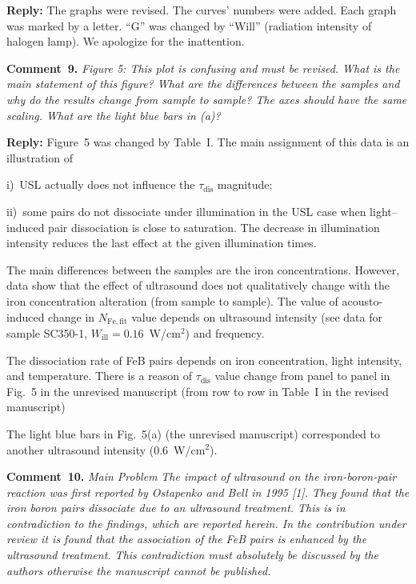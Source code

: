 \documentclass[aip,jap,preprint]{revtex4-1}
\begin{document}
\noindent
\textcolor[rgb]{0.51,0.00,0.00}{\textbf{Reply:}}
The graphs were revised.
The curves' numbers were added.
Each graph was marked by a letter.
``G'' was changed by ``Will'' (radiation intensity of halogen lamp).
We apologize for the inattention.


\vspace{1cm}
\noindent
\textcolor[rgb]{0.00,0.50,1.00}{\textbf{Comment~9.}}
\emph{Figure 5: This plot is confusing and must be revised. What is the main statement of this figure? What are the differences between the samples and why do the results change from sample to sample? The axes should have the same scaling. What are the light blue bars in (a)? }

\noindent
\textcolor[rgb]{0.51,0.00,0.00}{\textbf{Reply:}}
Figure~5 was changed by Table~I.
The main assignment of this data is an illustration of

\noindent
i)~USL actually does not influence the $\tau_\mathrm{dis}$  magnitude;

\noindent
ii)~some pairs do not dissociate under illumination in the USL case when light--induced pair dissociation is close to saturation.
The decrease in illumination intensity reduces the last effect at the given illumination times.

The main differences between the samples are the iron concentrations.
However, data show that
the effect of ultrasound does not qualitatively change with the iron concentration alteration
(from sample to sample).
The value of acousto-induced change in $N_\mathrm{Fe,fit}$ value depends on ultrasound intensity
(see data for sample SC350-1, $W_\mathrm{ill}=0.16$~W/cm$^2$) and frequency.


The dissociation rate of FeB pairs depends on iron concentration, light intensity, and
temperature\cite{Schmidt2019,FeBLight2,FeBKin2019,Lagowskii1993}.
There is a reason of $\tau_\mathrm{dis}$ value change from panel to panel in Fig.~5 in the unrevised manuscript (from row to row in Table~I in the revised manuscript)

The light blue bars in Fig.~5(a) (the unrevised manuscript) corresponded to another ultrasound intensity
(0.6~W/cm$^2$).

\vspace{1cm}
\noindent
\textcolor[rgb]{0.00,0.50,1.00}{\textbf{Comment~10.}}
\emph{Main Problem}
\emph{The impact of ultrasound on the iron-boron-pair reaction was first reported by Ostapenko and Bell in 1995 [1]. They found that the iron boron pairs dissociate due to an ultrasound treatment. This is in contradiction to the findings, which are reported herein. In the contribution under review it is found that the association of the FeB pairs is enhanced by the ultrasound treatment. This contradiction must absolutely be discussed by the authors otherwise the manuscript cannot be published.}
\end{document}
